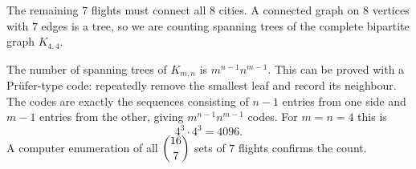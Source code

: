 The remaining $7$ flights must connect all $8$ cities. A connected graph on $8$ vertices with $7$ edges is a tree, so we are counting spanning trees of the complete bipartite graph $K_{4,4}$.

The number of spanning trees of $K_{m,n}$ is $m^{n-1}n^{m-1}$. This can be proved with a Pr\"ufer-type code: repeatedly remove the smallest leaf and record its neighbour. The codes are exactly the sequences consisting of $n-1$ entries from one side and $m-1$ entries from the other, giving $m^{n-1}n^{m-1}$ codes. For $m=n=4$ this is
\[
4^3\cdot4^3=\boxed{4096}.
\]
A computer enumeration of all $\dbinom{16}7$ sets of $7$ flights confirms the count.
